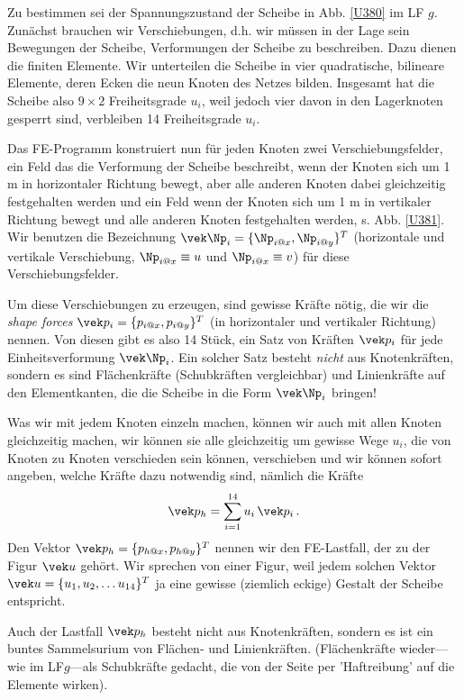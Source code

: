 {{Zu bestimmen sei der Spannungszustand der Scheibe in Abb. \ref{U380} im LF $g$. Zun\"{a}chst brauchen wir Verschiebungen, d.h. wir m\"{u}ssen in der Lage sein Bewegungen der Scheibe, Verformungen der Scheibe zu beschreiben. Dazu dienen die finiten Elemente. Wir unterteilen die Scheibe in vier quadratische, bilineare Elemente, deren Ecken die neun Knoten des Netzes bilden. Insgesamt hat die Scheibe also $9 \times 2$ Freiheitsgrade $u_i$, weil jedoch vier davon in den Lagerknoten gesperrt sind, verbleiben 14 Freiheitsgrade $u_i$.

Das FE-Programm konstruiert nun f\"{u}r jeden Knoten zwei Verschiebungsfelder, ein Feld das die Verformung der Scheibe beschreibt, wenn der Knoten sich um 1 m in horizontaler Richtung bewegt, aber alle anderen Knoten dabei gleichzeitig festgehalten werden und ein Feld wenn der Knoten sich um 1 m in vertikaler Richtung bewegt und alle anderen Knoten festgehalten werden, s. Abb. \ref{U381}. Wir benutzen die Bezeichnung $\vek \Np_i = \{\Np_{i @x}, \Np_{i @y}\}^T$ (horizontale und vertikale Verschiebung, $\Np_{i @x} \equiv u$ und $\Np_{i @x} \equiv v$) f\"{u}r diese Verschiebungsfelder.

Um diese Verschiebungen zu erzeugen, sind gewisse Kr\"{a}fte n\"{o}tig, die wir die {\em shape forces\/} $\vek p_i = \{p_{i @x}, p_{i @y}\}^T$ (in horizontaler und vertikaler Richtung) nennen. Von diesen gibt es also 14 St\"{u}ck, ein Satz von Kr\"{a}ften $\vek p_i$ f\"{u}r jede Einheitsverformung $\vek \Np_i$. Ein solcher Satz besteht {\em nicht\/} aus Knotenkr\"{a}ften, sondern es sind Fl\"{a}chenkr\"{a}fte (Schubkr\"{a}ften vergleichbar) und Linienkr\"{a}fte auf den Elementkanten, die die Scheibe in die Form $\vek \Np_i$ bringen!

Was wir mit jedem Knoten einzeln machen, k\"{o}nnen wir auch mit allen Knoten gleichzeitig machen, wir k\"{o}nnen sie alle gleichzeitig um gewisse Wege $u_i$, die von Knoten zu Knoten verschieden sein k\"{o}nnen, verschieben und wir k\"{o}nnen sofort angeben, welche Kr\"{a}fte dazu notwendig sind, n\"{a}mlich die Kr\"{a}fte
\begin{align}\label{Eq99}
\vek p_h = \sum_{i = 1}^{14} u_i\,\vek p_i\,.
\end{align}
Den Vektor $\vek p_h = \{p_{h @x}, p_{h @y}\}^T$ nennen wir den FE-Lastfall, der zu der Figur $\vek u$ geh\"{o}rt. Wir sprechen von einer Figur, weil jedem solchen Vektor $\vek u = \{u_1, u_2, \ldots u_{14}\}^T$ ja eine gewisse (ziemlich eckige) Gestalt der Scheibe entspricht.

Auch der Lastfall $\vek p_h$ besteht nicht aus Knotenkr\"{a}ften, sondern es ist ein buntes Sammelsurium von Fl\"{a}chen- und Linienkr\"{a}ften. (Fl\"{a}chenkr\"{a}fte wieder---wie im LF$g$---als Schubkr\"{a}fte gedacht, die von der Seite per 'Haftreibung' auf die Elemente wirken).

}}
